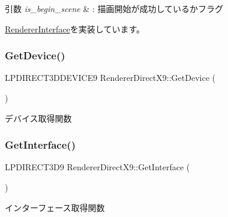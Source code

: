 \begin{DoxyParams}{引数}
{\em is\+\_\+begin\+\_\+scene} & \+: 描画開始が成功しているかフラグ \\
\hline
\end{DoxyParams}


\mbox{\hyperlink{class_renderer_interface_a0034a44420e4746062e70e4d66d3bee2}{Renderer\+Interface}}を実装しています。

\mbox{\label{class_renderer_direct_x9_a718458c1493c7d6814e01847e2e4164d}} 
\subsubsection{\texorpdfstring{Get\+Device()}{GetDevice()}}
{\footnotesize\ttfamily L\+P\+D\+I\+R\+E\+C\+T3\+D\+D\+E\+V\+I\+C\+E9 Renderer\+Direct\+X9\+::\+Get\+Device (\begin{DoxyParamCaption}{ }\end{DoxyParamCaption})}



デバイス取得関数 

\mbox{\label{class_renderer_direct_x9_afa6521fe3ae4d5697687197cf5bf3c66}} 
\subsubsection{\texorpdfstring{Get\+Interface()}{GetInterface()}}
{\footnotesize\ttfamily L\+P\+D\+I\+R\+E\+C\+T3\+D9 Renderer\+Direct\+X9\+::\+Get\+Interface (\begin{DoxyParamCaption}{ }\end{DoxyParamCaption})}



インターフェース取得関数 

\mbox{\label{class_renderer_direct_x9_a28da461025c48770a360b8d399a8414f}} 
